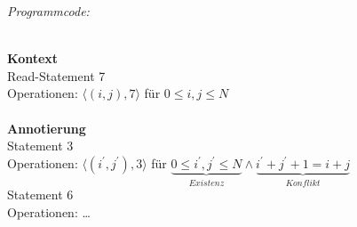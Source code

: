 \textit{Programmcode:}\\
    \begin{procedure}[H]
    \SetAlgoLined
    \end{procedure}

~\\[6cm]
\textbf{Kontext}\\
Read-Statement 7\\
Operationen: $\langle (i,j), 7 \rangle$ für $0 \leq i, j \leq N$\\
\\
\textbf{Annotierung}\\
Statement 3\\
Operationen: \(\langle (i^\prime,j^\prime), 3 \rangle\) für \( \underbrace{0 \leq i^\prime, j^\prime \leq N}_{Existenz} \land \underbrace{i^\prime + j^\prime + 1 = i + j}_{Konflikt}\)\\
Statement 6\\
Operationen: \dots\\

